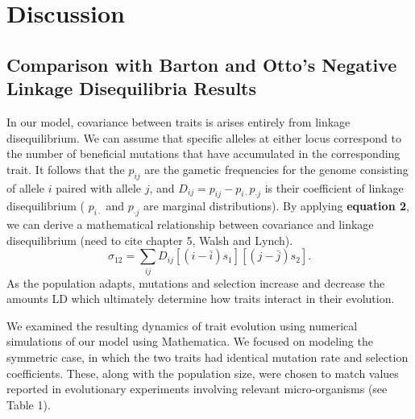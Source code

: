 \documentclass[11pt,twocolumn]{article}
\begin{document}
\section{Discussion}

\subsection{Comparison with Barton and Otto's Negative Linkage Disequilibria Results}
In our model, covariance between traits is arises entirely from linkage disequilibrium. We can assume that specific alleles at either locus correspond to the number of beneficial mutations that have accumulated in the corresponding trait.  It follows that the $p_{ij}$ are the gametic frequencies for the genome consisting of allele $i$ paired with allele $j$, and $D_{ij} = p_{ij}-p_{i\cdot} p_{\cdot j}$ is their coefficient of linkage disequilibrium ( $p_{i\cdot}$ and $p_{\cdot j}$ are marginal distributions). By applying \textbf{equation 2}, we can derive a mathematical relationship between covariance and linkage disequilibrium (need to cite chapter 5, Walsh and Lynch).
% 
% 
\begin{equation}
\sigma_{12}=\sum_{ij}D_{ij}[(i-\bar{i})s_1][(j-\bar{j})s_2]. 
\end{equation} 
As the population adapts, mutations and selection  increase and decrease the amounts LD which ultimately determine how traits interact in their evolution.\par

We examined the resulting dynamics of trait evolution using numerical simulations of our model using Mathematica. We focused on modeling the symmetric case, in which the two traits had identical mutation rate and selection coefficients. These, along with the population size, were chosen to match values reported in evolutionary experiments involving relevant micro-organisms (see Table 1). 




\end{document}
